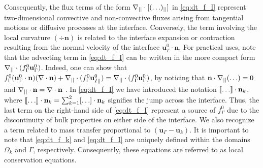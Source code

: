 Consequently, the flux terms of the form $\mathbf{\nabla}_{||}\cdot[(\ldots)_{||}]$ in \ref{eq:dt_f_I} represent two-dimensional  convective and non-convective fluxes arising from tangential motions or diffusive processes at the interface.
Conversely, the term involving the local curvature $(\div \textbf{n})$ is related to the interface expansion or contraction resulting from the normal velocity of the interface $\textbf{u}_\Gamma^0\cdot \textbf{n}$. For practical uses, note that the advecting term in \ref{eq:dt_f_I} can be written in the more compact form $\mathbf{\nabla}_{||}\cdot(f_\Gamma^0 \textbf{u}_\Gamma^0)$. 
Indeed, one can show that $f_\Gamma^0 (\textbf{u}_\Gamma^0 \cdot \textbf{n})(\mathbf{\nabla}\cdot \textbf{n})
+\mathbf{\nabla}_{||}\cdot(f_\Gamma^0 \textbf{u}_{I||}^0) = \mathbf{\nabla}_{||}\cdot(f_\Gamma^0 \textbf{u}_\Gamma^0)$, by noticing that $\textbf{n}\cdot\mathbf{\nabla}_{||}(\ldots) = 0$ and $\mathbf{\nabla}_{||}\cdot\textbf{n} = \mathbf{\nabla}\cdot\textbf{n}$ \citep{nadim1996concise}.
In \ref{eq:dt_f_I} we have introduced the notation $\llbracket \ldots \rrbracket \cdot \textbf{n}_k$, where $\llbracket \ldots \rrbracket \cdot \textbf{n}_k = \sum_{k=1}^2 [\ldots] \cdot \textbf{n}_k$ signifies the jump across the interface. Thus, the last term on the right-hand side of \ref{eq:dt_f_I} represent a source of $f_\Gamma^0$ due to the discontinuity of bulk properties on either side of the interface. We also recognize a term related to mass transfer proportional to $(\textbf{u}_\Gamma - \textbf{u}_k)$. %
It is important to note that \ref{eq:dt_f_k} and \ref{eq:dt_f_I} are uniquely defined within the domains $\Omega_k$ and $\Gamma$, respectively.
Consequently, these equations are referred to as local conservation equations.



 


